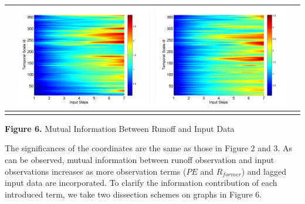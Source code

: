 \documentclass[draft,wrr]{AGUTeX}
\begin{document}
\begin{article}
\begin{table}[H]
\begin{tabular}{cccc}
&\begin{minipage}{.3\textwidth}\includegraphics[width=\linewidth]{resultgraph/06810000pep.png}\end{minipage}
&\begin{minipage}{.3\textwidth}\includegraphics[width=\linewidth]{resultgraph/06810000pepq.png}\end{minipage}
\\
\hline
\\
\end{tabular}
\Large{\textbf{Figure 6.} Mutual Information Between Runoff and Input Data }
\end{table}
The significances of the coordinates are the same as those in Figure 2
and 3. As can be observed, mutual information between runoff observation and input observations increases as more observation terms ($PE$ and $R_{former}$) and lagged input data are incorporated. To clarify the information contribution of each introduced term, 
we take two dissection schemes on graphs in Figure 6.

\end{article}
\end{document}
